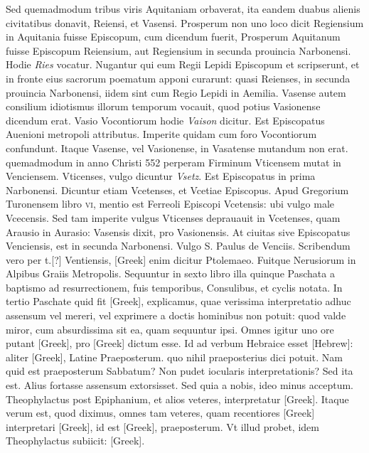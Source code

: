 \begin{parnumbers}
{}
Sed quemadmodum tribus viris Aquitaniam orbaverat, ita eandem duabus
alienis civitatibus donavit, Reiensi, et Vasensi.
\lnr{}Prosperum non uno
loco dicit Regiensium in Aquitania fuisse Episcopum, cum dicendum
fuerit, Prosperum Aquitanum fuisse Episcopum Reiensium,
aut Regiensium in secunda prouincia Narbonensi.
\lnr{}Hodie \textit{Ries} vocatur.
\lnr{}Nugantur qui eum Regii Lepidi Episcopum et scripserunt,
et in fronte eius sacrorum poematum apponi curarunt: quasi Reienses,
in secunda prouincia Narbonensi, iidem sint cum Regio Lepidi
in Aemilia.
\lnr{}Vasense autem consilium idiotismus illorum temporum
vocauit, quod potius Vasionense dicendum erat.
\lnr{}Vasio Vocontiorum hodie \textit{Vaison} dicitur.
\lnr{}Est Episcopatus Auenioni metropoli
attributus.
\lnr{}Imperite quidam cum foro Vocontiorum confundunt.
\lnr{}Itaque Vasense, vel Vasionense, in Vasatense mutandum non
erat.
\lnr{}quemadmodum in anno Christi 552 perperam Firminum
Vticensem mutat in Venciensem.
\lnr{}Vticenses, vulgo dicuntur \textit{Vsetz}.
\lnr{}Est Episcopatus in prima Narbonensi.
\lnr{}Dicuntur etiam Vcetenses,
et Vcetiae Episcopus.
\lnr{}Apud Gregorium Turonensem libro \textsc{vi},
mentio est Ferreoli Episcopi Vcetensis: ubi vulgo male Vcecensis.
\lnr{}Sed tam imperite vulgus Vticenses deprauauit in Vcetenses, quam
Arausio in Aurasio: Vasensis dixit, pro Vasionensis.
\lnr{}At ciuitas sive
Episcopatus Venciensis, est in secunda Narbonensi. Vulgo S. Paulus
de Venciis.
\lnr{}Scribendum vero per t.[?] Ventiensis, \textgreek{[Greek]} enim dicitur
Ptolemaeo.
\lnr{}Fuitque Nerusiorum in Alpibus Graiis Metropolis.
\lnr{}Sequuntur in sexto libro illa quinque Paschata a baptismo
ad resurrectionem, fuis temporibus, Consulibus, et cyclis notata.
\lnr{}In tertio Paschate quid fit \textgreek{[Greek]}, explicamus,
quae verissima interpretatio adhuc assensum vel mereri, vel
exprimere a doctis hominibus non potuit: quod valde miror,
cum absurdissima sit ea, quam sequuntur ipsi.
\lnr{}Omnes igitur uno
ore putant \textgreek{[Greek]}, pro \textgreek{[Greek]} dictum esse.
\lnr{}Id ad verbum
Hebraice esset \texthebrew{[Hebrew]}:
 aliter \textgreek{[Greek]}, Latine Praeposterum.
\lnr{}quo nihil praeposterius dici potuit.
\lnr{}Nam quid est praeposterum Sabbatum?
\lnr{}Non pudet iocularis interpretationis?
\lnr{}Sed ita est.
\lnr{}Alius fortasse assensum extorsisset.
\lnr{}Sed quia a nobis, ideo
minus acceptum.
\lnr{}Theophylactus post Epiphanium, et alios veteres,
interpretatur \textgreek{[Greek]}.
\lnr{}Itaque verum est, quod diximus, omnes tam veteres, quam
recentiores \textgreek{[Greek]} interpretari
 \textgreek{[Greek]}, id est \textgreek{[Greek]},
praeposterum.
\lnr{}Vt illud probet, idem Theophylactus
subiicit: \textgreek{[Greek]}.


\end{parnumbers}
